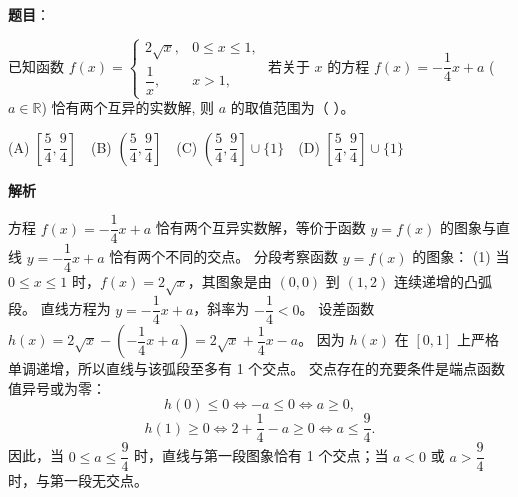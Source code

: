 \begin{answer}

\textbf{题目}：

已知函数 $f(x) = \begin{cases} 2\sqrt{x}, & 0 \leqslant x \leqslant 1, \\ \dfrac{1}{x}, & x > 1, \end{cases}$ 若关于 $x$ 的方程 $f(x) = -\dfrac{1}{4}x + a$ ($a \in \mathbb{R}$) 恰有两个互异的实数解, 则 $a$ 的取值范围为（ ）。

(A) $\left[\dfrac{5}{4}, \dfrac{9}{4}\right]$　(B) $\left(\dfrac{5}{4}, \dfrac{9}{4}\right]$　(C) $\left(\dfrac{5}{4}, \dfrac{9}{4}\right] \cup \{1\}$　(D) $\left[\dfrac{5}{4}, \dfrac{9}{4}\right] \cup \{1\}$

\textbf{解析}

方程 $f(x) = -\dfrac{1}{4}x + a$ 恰有两个互异实数解，等价于函数 $y = f(x)$ 的图象与直线 $y = -\dfrac{1}{4}x + a$ 恰有两个不同的交点。
分段考察函数 $y = f(x)$ 的图象：
(1) 当 $0 \leqslant x \leqslant 1$ 时，$f(x) = 2\sqrt{x}$，其图象是由 $(0, 0)$ 到 $(1, 2)$ 连续递增的凸弧段。
直线方程为 $y = -\dfrac{1}{4}x + a$，斜率为 $-\dfrac{1}{4} < 0$。
设差函数 $h(x) = 2\sqrt{x} - \left(-\dfrac{1}{4}x + a\right) = 2\sqrt{x} + \dfrac{1}{4}x - a$。
因为 $h(x)$ 在 $[0, 1]$ 上严格单调递增，所以直线与该弧段至多有 1 个交点。
交点存在的充要条件是端点函数值异号或为零：
\nopagebreak[4]
\[h(0) \leqslant 0 \iff -a \leqslant 0 \iff a \geqslant 0,\]
\nopagebreak[4]
\[h(1) \geqslant 0 \iff 2 + \frac{1}{4} - a \geqslant 0 \iff a \leqslant \frac{9}{4}.\]
因此，当 $0 \leqslant a \leqslant \dfrac{9}{4}$ 时，直线与第一段图象恰有 1 个交点；当 $a < 0$ 或 $a > \dfrac{9}{4}$ 时，与第一段无交点。


\end{answer}
